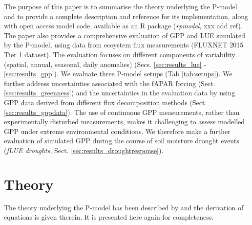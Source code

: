 \documentclass{myreport}
\begin{document}
The purpose of this paper is to summarise the theory underlying the P-model and to provide a complete description and reference for its implementation, along with open access model code, available as an R package (\textit{rpmodel}, xxx add ref). The paper also provides a comprehensive evaluation of GPP and LUE simulated by the P-model, using data from ecoystem flux measurements (FLUXNET 2015 Tier 1 dataset). The evaluation focuses on different components of variability (spatial, annual, seasonal, daily anomalies) (Secs. \ref{sec:results_lue} - \ref{sec:results_gpp}). We evaluate three P-model setups (Tab \ref{tab:setups}). We further address uncertainties associated with the fAPAR  forcing (Sect. \ref{sec:results_greenness}) and the uncertainties in the evaluation data by using  GPP data derived from different flux decomposition methods (Sect. \ref{sec:results_gppdata}). The use of continuous GPP measurements, rather than experimentally disturbed measurements, makes it challenging to assess modelled GPP under extreme environmental conditions. We therefore make a further evaluation of simulated GPP during the course of soil moisture drought events (\textit{fLUE droughts}, Sect. \ref{sec:results_droughtresponse}).


\section{Theory}
\label{sec:theory}

The theory underlying the P-model has been described by \citet{wang17natpl} and the derivation of equations is given therein. It is presented here again for completeness.
\end{document}
